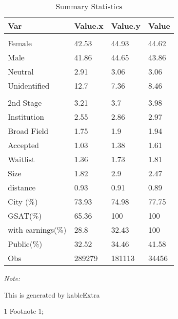 \begin{table}
\centering
\caption{Summary Statistics}
\centering
\begin{threeparttable}
\begin{tabular}[t]{llll}
\toprule
Var & Value.x & Value.y & Value\\
\midrule
\addlinespace[0.3em]
\multicolumn{4}{l}{\textit{\textbf{Gender (\%)}}}\\
\hspace{1em}Female & 42.53 & 44.93 & 44.62\\
\hspace{1em}Male & 41.86 & 44.65 & 43.86\\
\hspace{1em}Neutral & 2.91 & 3.06 & 3.06\\
\hspace{1em}Unidentified & 12.7 & 7.36 & 8.46\\
\addlinespace[0.3em]
\multicolumn{4}{l}{\textit{\textbf{Personal Application}}}\\
\hspace{1em}2nd Stage & 3.21 & 3.7 & 3.98\\
\hspace{1em}Institution & 2.55 & 2.86 & 2.97\\
\hspace{1em}Broad Field & 1.75 & 1.9 & 1.94\\
\hspace{1em}Accepted & 1.03 & 1.38 & 1.61\\
\hspace{1em}Waitlist & 1.36 & 1.73 & 1.81\\
Size & 1.82 & 2.9 & 2.47\\
distance & 0.93 & 0.91 & 0.89\\
City (\%) & 73.93 & 74.98 & 77.75\\
GSAT(\%) & 65.36 & 100 & 100\\
with earnings(\%) & 28.8 & 32.43 & 100\\
Public(\%) & 32.52 & 34.46 & 41.58\\
Obs & 289279 & 181113 & 34456\\
\bottomrule
\end{tabular}
\begin{tablenotes}
\item \textit{Note: } 
\item This is generated by kableExtra
\item[1] Footnote 1; 
\end{tablenotes}
\end{threeparttable}
\end{table}
